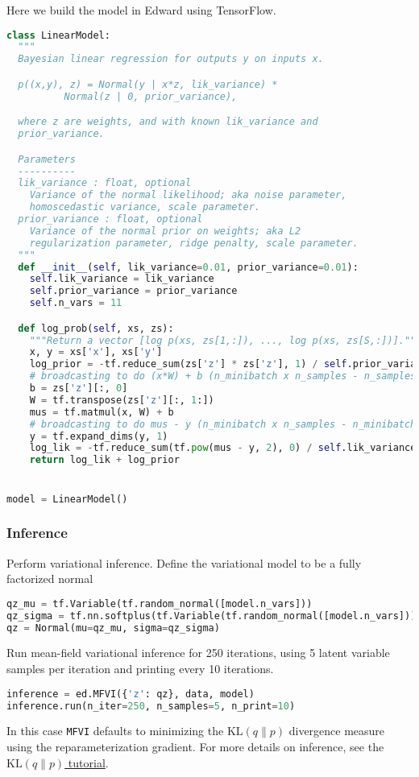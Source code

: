 Here we build the model in Edward using TensorFlow.
\begin{lstlisting}[language=Python]
class LinearModel:
  """
  Bayesian linear regression for outputs y on inputs x.

  p((x,y), z) = Normal(y | x*z, lik_variance) *
          Normal(z | 0, prior_variance),

  where z are weights, and with known lik_variance and
  prior_variance.

  Parameters
  ----------
  lik_variance : float, optional
    Variance of the normal likelihood; aka noise parameter,
    homoscedastic variance, scale parameter.
  prior_variance : float, optional
    Variance of the normal prior on weights; aka L2
    regularization parameter, ridge penalty, scale parameter.
  """
  def __init__(self, lik_variance=0.01, prior_variance=0.01):
    self.lik_variance = lik_variance
    self.prior_variance = prior_variance
    self.n_vars = 11

  def log_prob(self, xs, zs):
    """Return a vector [log p(xs, zs[1,:]), ..., log p(xs, zs[S,:])]."""
    x, y = xs['x'], xs['y']
    log_prior = -tf.reduce_sum(zs['z'] * zs['z'], 1) / self.prior_variance
    # broadcasting to do (x*W) + b (n_minibatch x n_samples - n_samples)
    b = zs['z'][:, 0]
    W = tf.transpose(zs['z'][:, 1:])
    mus = tf.matmul(x, W) + b
    # broadcasting to do mus - y (n_minibatch x n_samples - n_minibatch x 1)
    y = tf.expand_dims(y, 1)
    log_lik = -tf.reduce_sum(tf.pow(mus - y, 2), 0) / self.lik_variance
    return log_lik + log_prior


model = LinearModel()
\end{lstlisting}


\subsubsection{Inference}

Perform variational inference.
Define the variational model to be a fully factorized normal
\begin{lstlisting}[language=Python]
qz_mu = tf.Variable(tf.random_normal([model.n_vars]))
qz_sigma = tf.nn.softplus(tf.Variable(tf.random_normal([model.n_vars])))
qz = Normal(mu=qz_mu, sigma=qz_sigma)
\end{lstlisting}

Run mean-field variational inference for 250 iterations, using 5
latent variable samples per iteration and printing
every 10 iterations.
\begin{lstlisting}[language=Python]
inference = ed.MFVI({'z': qz}, data, model)
inference.run(n_iter=250, n_samples=5, n_print=10)
\end{lstlisting}
In this case \texttt{MFVI} defaults to minimizing the
$\text{KL}(q\|p)$ divergence measure using the reparameterization
gradient.
For more details on inference, see the \href{tut_KLqp}{$\text{KL}(q\|p)$ tutorial}.


